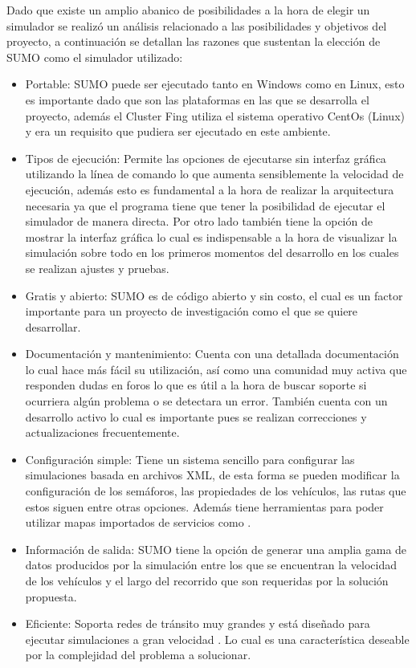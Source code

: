 Dado que existe un amplio abanico de posibilidades a la hora de elegir un simulador se realizó un análisis relacionado a las posibilidades y objetivos del proyecto, a continuación se detallan las razones que sustentan la elección de SUMO como el simulador utilizado:

\begin{itemize}
	\item Portable: SUMO puede ser ejecutado tanto en Windows como en Linux, esto es importante dado que son las plataformas en las que se desarrolla el proyecto, además el Cluster Fing utiliza el sistema operativo CentOs (Linux) y era un requisito que pudiera ser ejecutado en este ambiente.
	
	\item Tipos de ejecución: Permite las opciones de ejecutarse sin interfaz gráfica utilizando la línea de comando lo que aumenta sensiblemente la velocidad de ejecución, además esto es fundamental a la hora de realizar la arquitectura necesaria ya que el programa tiene que tener la posibilidad de ejecutar el simulador de manera directa. Por otro lado también tiene la opción de mostrar la interfaz gráfica lo cual es indispensable a la hora de visualizar la simulación sobre todo en los primeros momentos del desarrollo en los cuales se realizan ajustes y pruebas.
	
	\item Gratis y abierto: SUMO es de código abierto y sin costo, el cual es un factor importante para un proyecto de investigación como el que se quiere desarrollar. 
	
	\item Documentación y mantenimiento: Cuenta con una detallada documentación lo cual hace más fácil su utilización, así como una comunidad muy activa que responden dudas en foros lo que es útil a la hora de buscar soporte si ocurriera algún problema o se detectara un error. También cuenta con un desarrollo activo lo cual es importante pues se realizan correcciones y actualizaciones frecuentemente.
	
	\item Configuración simple: Tiene un sistema sencillo para configurar las simulaciones basada en archivos XML, de esta forma se pueden modificar la configuración de los semáforos, las propiedades de los vehículos, las rutas que estos siguen entre otras opciones. Además tiene herramientas para poder utilizar mapas importados de servicios como \citet{OSM}.
	
	\item Información de salida: SUMO tiene la opción de generar una amplia gama de datos producidos por la simulación entre los que se encuentran la velocidad de los vehículos y el largo del recorrido que son requeridas por la solución propuesta. 
	
	\item Eficiente: Soporta redes de tránsito muy grandes y está diseñado para ejecutar simulaciones a gran velocidad \citep{sumo2014}. Lo cual es una característica deseable por la complejidad del problema a solucionar.
	
\end{itemize}


